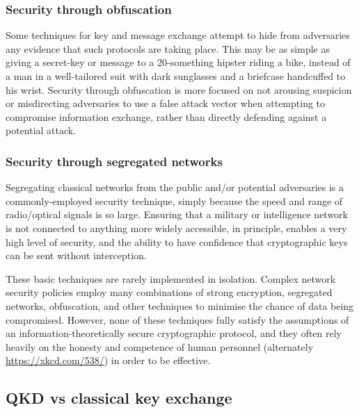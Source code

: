 \documentclass[twocolumn, aps, rmp, amsmath, amssymb, nofootinbib, superscriptaddress, longbibliography, floatfix, table-of-contents, eqsecnum]{revtex4-2}
\begin{document}
\subsubsection{Security through obfuscation}

Some techniques for key and message exchange attempt to hide from adversaries any evidence that such protocols are taking place. This may be as simple as giving a secret-key or message to a 20-something hipster riding a bike, instead of a man in a well-tailored suit with dark sunglasses and a briefcase handcuffed to his wrist. Security through obfuscation is more focused on not arousing suspicion or misdirecting adversaries to use a false attack vector when attempting to compromise information exchange, rather than directly defending against a potential attack. 

\subsubsection{Security through segregated networks}

Segregating classical networks from the public and/or potential adversaries is a commonly-employed security technique, simply because the speed and range of radio/optical signals is so large. Ensuring that a military or intelligence network is not connected to anything more widely accessible, in principle, enables a very high level of security, and the ability to have confidence that cryptographic keys can be sent without interception. 

These basic techniques are rarely implemented in isolation. Complex network security policies employ many combinations of strong encryption, segregated networks, obfuscation, and other techniques to minimise the chance of data being compromised. However, none of these techniques fully satisfy the assumptions of an information-theoretically secure cryptographic protocol, and they often rely heavily on the honesty and competence of human personnel (alternately \href{https://xkcd.com/538/}{https://xkcd.com/538/}) in order to be effective. 

\subsection{QKD vs classical key exchange}
\end{document}
